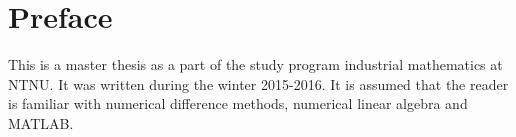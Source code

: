 \section*{Preface}
This is a master thesis as a part of the study program industrial mathematics at NTNU. It was written during the winter 2015-2016. 
It is assumed that the reader is familiar with numerical difference methods, numerical linear algebra and MATLAB.



